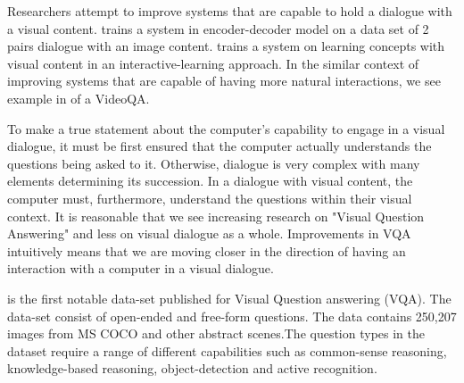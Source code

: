 Researchers attempt to improve systems that are capable to hold a dialogue with a visual content. \cite{das2017visual} trains a system in  encoder-decoder model on a data set of 2 pairs dialogue with an image content.\cite{Skoaj2011ASF} trains a system on learning concepts with visual content in an interactive-learning approach. In the similar context of improving systems that are capable of having more natural interactions, we see example in \cite{Lin2014VisualSS} of a VideoQA. 

To make a true statement about the computer's capability to engage in a visual dialogue, it must be first ensured that the computer actually understands the questions being asked to it. Otherwise, dialogue is very complex with many elements determining its succession. In a dialogue with visual content, the computer must, furthermore, understand the questions within their visual context. It is reasonable that we see increasing research on "Visual Question Answering" and less on visual dialogue as a whole. Improvements in VQA intuitively means that we are moving closer in the direction of having an interaction with a computer in a visual dialogue.  


 \cite{VQA} is the first notable data-set published for Visual Question answering (VQA). The data-set consist of open-ended and free-form questions. The data contains 250,207 images from MS COCO \cite{lin2015microsoft} and other abstract scenes.The question types in the dataset require a range of different capabilities such as common-sense reasoning, knowledge-based reasoning, object-detection and active recognition.
 
